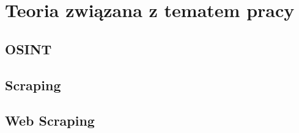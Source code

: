 \newpage

\section{Teoria związana z tematem pracy}\label{sec:teoria}

\subsection{OSINT}\label{subsec:osint}


\subsection{Scraping}\label{subsec:scraping}


\subsection{Web Scraping}\label{subsec:web-scraping}

